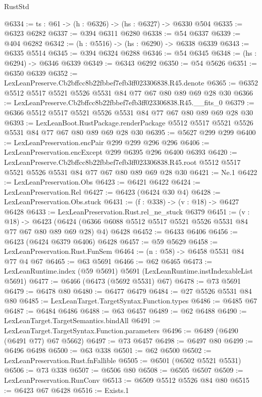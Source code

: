 \begin{lexlean}{RustStd}
\begin{coremodule}
@6334 := {ts : @61} -> (h : @6326) -> (hs : @6327) -> @6330 @504
@6335 := @6323 @6282
@6337 := @394 @6311 @6280
@6338 := @54 @6337
@6339 := @404 @6282
@6342 := (h : @5516) -> (hs : @6290) -> @6338 @6339
@6343 := @6335 @5514
@6345 := @394 @6324 @6288
@6346 := @54 @6345
@6348 := (hs : @6294) -> @6346 @6339
@6349 := @6343 @6292
@6350 := @54 @5626
@6351 := @6350 @6339
@6352 := LexLeanPreserve.Cb2bffcc8b22fbbef7efb3ff023306838.R45.denote
@6365 := @6352 @5512 @5517 @5521 @5526 @5531 @84 @77 @67 @80 @89 @69 @28 @30
@6366 := LexLeanPreserve.Cb2bffcc8b22fbbef7efb3ff023306838.R45.__fits_0
@6379 := @6366 @5512 @5517 @5521 @5526 @5531 @84 @77 @67 @80 @89 @69 @28 @30
@6393 := LexLeanBoot.RustPackage.renderPackage
    @5512
    @5517
    @5521
    @5526
    @5531
    @84
    @77
    @67
    @80
    @89
    @69
    @28
    @30
@6395 := @5627 @299 @299
@6400 := LexLeanPreservation.encPair @299 @299 @296 @296
@6406 := LexLeanPreservation.encExcept @299 @6395 @296 @6400 @6393
@6420 := LexLeanPreserve.Cb2bffcc8b22fbbef7efb3ff023306838.R45.root
    @5512
    @5517
    @5521
    @5526
    @5531
    @84
    @77
    @67
    @80
    @89
    @69
    @28
    @30
@6421 := Ne.{1}
@6422 := LexLeanPreservation.Obs
@6423 := @6421 @6422
@6424 := LexLeanPreservation.Rel
@6427 := @6423 (@6424 @30 @4)
@6428 := LexLeanPreservation.Obs.stuck
@6431 := (f : @338) -> (v : @18) -> @6427 @6428
@6433 := LexLeanPreservation.Rust.rel_ne_stuck @6379
@6451 := (v : @18) ->
  @6423 (@6424 (@6366 @6088 @5512 @5517 @5521 @5526 @5531 @84 @77 @67 @80 @89 @69 @28) @4) @6428
@6452 := @6433 @6406
@6456 := @6423 (@6424 @6379 @6406) @6428
@6457 := @59 @5629
@6458 := LexLeanPreservation.Rust.FunSem
@6464 := (n : @58) -> @6458 @5531 @84 @77 @4 @67
@6465 := @63 @5691
@6466 := @62 @6465
@6473 := LexLeanRuntime.index (@59 @5691) @5691 (LexLeanRuntime.instIndexableList @5691)
@6477 := @6466 (@6473 (@5692 @5531) @67)
@6478 := @73 @5691
@6479 := @6478 @80
@6480 := @6477 @6479
@6484 := @27 @5526 @5531 @84 @80
@6485 := LexLeanTarget.TargetSyntax.Function.types
@6486 := @6485 @67
@6487 := @6484 @6486
@6488 := @63 @6457
@6489 := @62 @6488
@6490 := LexLeanTarget.TargetSemantics.bindAll
@6491 := LexLeanTarget.TargetSyntax.Function.parameters
@6496 := @6489 (@6490 (@6491 @77) @67 @5662)
@6497 := @73 @6457
@6498 := @6497 @80
@6499 := @6496 @6498
@6500 := @63 @338
@6501 := @62 @6500
@6502 := LexLeanPreservation.Rust.fnFallible
@6505 := @6501 (@6502 @5521 @5531)
@6506 := @73 @338
@6507 := @6506 @80
@6508 := @6505 @6507
@6509 := LexLeanPreservation.RunConv
@6513 := @6509 @5512 @5526 @84 @80
@6515 := @6423 @67 @6428
@6516 := Exists.{1}

\end{coremodule}
\end{lexlean}

